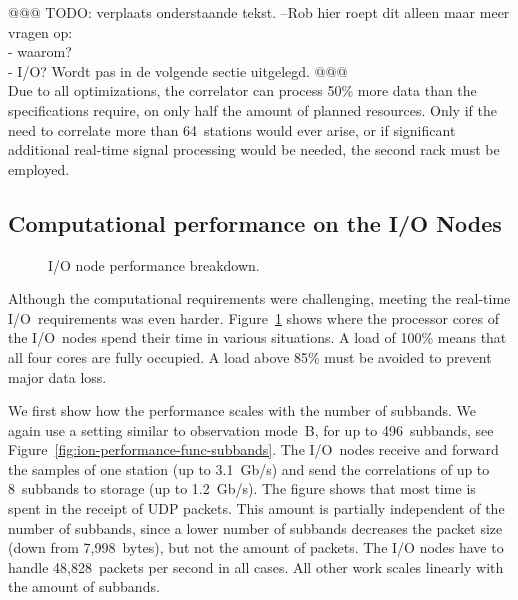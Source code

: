 \documentclass[10pt]{article}
\begin{document}
\noindent @@@ TODO: verplaats onderstaande tekst.  --Rob
hier roept dit alleen maar meer vragen op: \\
 - waarom? \\
 - I/O? Wordt pas in de volgende sectie uitgelegd. @@@ \\
Due to all optimizations, the correlator can process 50\% more data than
the specifications require, on only half the amount of planned resources.
Only if the need to correlate more than 64~stations would ever arise, or if
significant additional real-time signal processing would be needed, the
second rack must be employed.



\subsection{Computational performance on the I/O Nodes}
\label{sec:ION-performance}

\begin{figure}
\hspace{9mm}
\hspace{1cm}
\caption{I/O node performance breakdown.}
\label{fig:ion-performance}
\end{figure}

Although the computational requirements were challenging, meeting the real-time
I/O~requirements was even harder.
Figure~\ref{fig:ion-performance} shows where the processor cores of the
I/O~nodes spend their time in various situations.
A load of 100\% means that all four cores are fully occupied.
A load above 85\% must be avoided to prevent major data loss.

We first show how the performance scales with the number of subbands.
We again use a setting similar to observation mode~\textsf{B}, for up to
496~subbands, see Figure~\ref{fig:ion-performance-func-subbands}.
The I/O~nodes receive and forward the samples
of one station (up to 3.1~Gb/s) and send the correlations of up to 8~subbands
to storage (up to 1.2~Gb/s).
The figure shows that most time is spent in the receipt of UDP packets.
This amount is partially independent of the number of subbands, since a lower
number of subbands decreases the packet size (down from 7,998~bytes), but not
the amount of packets. The I/O nodes have to handle 48,828~packets per second in all cases.
All other work scales linearly with the amount of subbands.
\end{document}
